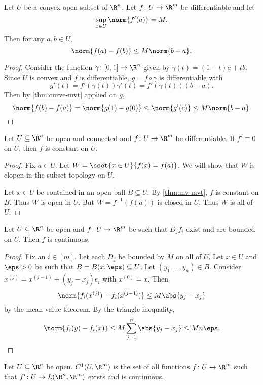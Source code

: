 \begin{proposition*} \label{thm:mv-mvt}
    Let $U$ be a convex open subset of $\R^n$.
    Let $f\colon U \to \R^m$ be differentiable and let \[
        \sup_{x \in U} \norm{f'(a)} = M.
    \] Then for any $a, b \in U$, \[
        \norm{f(a) - f(b)} \le M \norm{b - a}.
    \]
\end{proposition*}
\begin{proof}
    Consider the function $\gamma\colon [0, 1] \to \R^n$ given by
    $\gamma(t) = (1-t)a + tb$.
    Since $U$ is convex and $f$ is differentiable, $g = f \circ \gamma$ is
    differentiable with \[
        g'(t) = f'(\gamma(t)) \gamma'(t)
            = f'(\gamma(t)) (b - a).
    \] Then by \cref{thm:curve-mvt} applied on $g$, \[
        \norm{f(b) - f(a)} = \norm{g(1) - g(0)}
            \le \norm{g'(c)} \le M \norm{b - a}. \qedhere
    \]
\end{proof}

\begin{proposition}
    Let $U \subseteq \R^n$ be open and connected and $f\colon U \to \R^m$
    be differentiable.
    If $f' \equiv 0$ on $U$, then $f$ is constant on $U$.
\end{proposition}
\begin{proof}
    Fix $a \in U$.
    Let $W = \sset{x \in U}{f(x) = f(a)}$.
    We will show that $W$ is clopen in the subset topology on $U$.

    Let $x \in U$ be contained in an open ball $B \subseteq U$.
    By \cref{thm:mv-mvt}, $f$ is constant on $B$.
    Thus $W$ is open in $U$.
    But $W = f^{-1}(f(a))$ is closed in $U$.
    Thus $W$ is all of $U$.
\end{proof}

\begin{proposition} \label{thm:pdv-cont}
    Let $U \subseteq \R^n$ be open and $f\colon U \to \R^m$ be such that
    $D_j f_i$ exist and are bounded on $U$.
    Then $f$ is continuous.
\end{proposition}
\begin{proof}
    Fix an $i \in [m]$.
    Let each $D_j$ be bounded by $M$ on all of $U$.
    Let $x \in U$ and $\eps > 0$ be such that
    $B = B(x, \eps) \subseteq U$.
    Let $(y_1, \dots, y_n) \in B$.
    Consider $x^{(j)} = x^{(j-1)} + (y_j - x_j) e_i$ with $x^{(0)} = x$.
    Then \[
        \norm{f_i(x^{(j)}) - f_i(x^{(j-1)})} \le M \abs{y_j - x_j}
    \] by the mean value theorem.
    By the triangle inequality, \[
        \norm{f_i(y) - f_i(x)} \le M \sum_{j=1}^n \abs{y_j - x_j}
            \le M n \eps. \qedhere
    \]
\end{proof}

\begin{definition*} \label{def:c1}
    Let $U \subseteq \R^n$ be open.
    $C^1(U, \R^m)$ is the set of all functions $f\colon U \to \R^m$
    such that $f'\colon U \to L(\R^n, \R^m)$ exists and is continuous.
\end{definition*}
